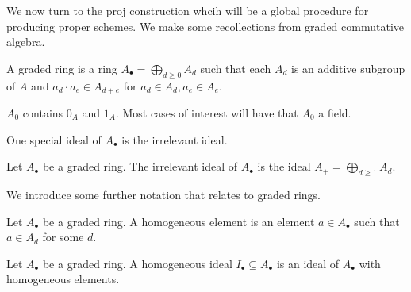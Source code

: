 We now turn to the proj construction whcih will be a global procedure for producing proper schemes. We make some recollections from graded commutative algebra. 
\begin{definition}\label{def: graded ring}
    A graded ring is a ring $A_{\bullet}=\bigoplus_{d\geq0}A_{d}$ such that each $A_{d}$ is an additive subgroup of $A$ and $a_{d}\cdot a_{e}\in A_{d+e}$ for $a_{d}\in A_{d},a_{e}\in A_{e}$. 
\end{definition}
\begin{remark}
    $A_{0}$ contains $0_{A}$ and $1_{A}$. Most cases of interest will have that $A_{0}$ a field. 
\end{remark}
One special ideal of $A_{\bullet}$ is the irrelevant ideal. 
\begin{definition}\label{def: irrelevant ideal}
    Let $A_{\bullet}$ be a graded ring. The irrelevant ideal of $A_{\bullet}$ is the ideal $A_{+}=\bigoplus_{d\geq 1}A_{d}$. 
\end{definition}
We introduce some further notation that relates to graded rings. 
\begin{definition}\label{def: homogeneous element}
    Let $A_{\bullet}$ be a graded ring. A homogeneous element is an element $a\in A_{\bullet}$ such that $a\in A_{d}$ for some $d$. 
\end{definition}
\begin{definition}\label{def: homogeneous element}
    Let $A_{\bullet}$ be a graded ring. A homogeneous ideal $I_{\bullet}\subseteq A_{\bullet}$ is an ideal of $A_{\bullet}$ with homogeneous elements. 
\end{definition}